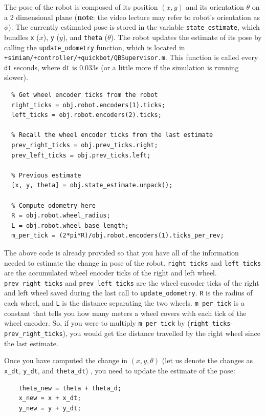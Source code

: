 \documentclass[10pt]{article}
\begin{document}
\begin{enumerate}
 The pose of the robot is composed of its position $(x,y)$ and its orientation $\theta$ on a 2 dimensional plane (\textbf{note}: the video lecture may refer to robot's orientation as $\phi$). The currently estimated pose is stored in the variable \texttt{state\_estimate}, which bundles \texttt{x} ($x$), \texttt{y} ($y$), and \texttt{theta} ($\theta$). The robot updates the estimate of its pose by calling the \texttt{update\_odometry} function, which is located in \texttt{+simiam/+controller/+quickbot/QBSupervisor.m}. This function is called every \texttt{dt} seconds, where \texttt{dt} is $0.033$s (or a little more if the simulation is running slower).
 \begin{verbatim}  
  % Get wheel encoder ticks from the robot
  right_ticks = obj.robot.encoders(1).ticks;
  left_ticks = obj.robot.encoders(2).ticks;

  % Recall the wheel encoder ticks from the last estimate
  prev_right_ticks = obj.prev_ticks.right;
  prev_left_ticks = obj.prev_ticks.left;

  % Previous estimate 
  [x, y, theta] = obj.state_estimate.unpack();

  % Compute odometry here
  R = obj.robot.wheel_radius;
  L = obj.robot.wheel_base_length;
  m_per_tick = (2*pi*R)/obj.robot.encoders(1).ticks_per_rev;\end{verbatim}
  The above code is already provided so that you have all of the information needed to estimate the change in pose of the robot. \texttt{right\_ticks} and \texttt{left\_ticks} are the accumulated wheel encoder ticks of the right and left wheel. \texttt{prev\_right\_ticks} and \texttt{prev\_left\_ticks} are the wheel encoder ticks of the right and left wheel saved during the last call to \texttt{update\_odometry}. \texttt{R} is the radius of each wheel, and \texttt{L} is the distance separating the two wheels. \texttt{m\_per\_tick} is a constant that tells you how many meters a wheel covers with each tick of the wheel encoder. So, if you were to multiply \texttt{m\_per\_tick} by (\texttt{right\_ticks}-\texttt{prev\_right\_ticks}), you would get the distance travelled by the right wheel since the last estimate.
  
  Once you have computed the change in $(x,y,\theta)$ (let us denote the changes as \texttt{x\_dt}, \texttt{y\_dt}, and \texttt{theta\_dt}) , you need to update the estimate of the pose:
  \begin{verbatim}
    theta_new = theta + theta_d;
    x_new = x + x_dt;
    y_new = y + y_dt;\end{verbatim}
 

\end{enumerate}
\end{document}
